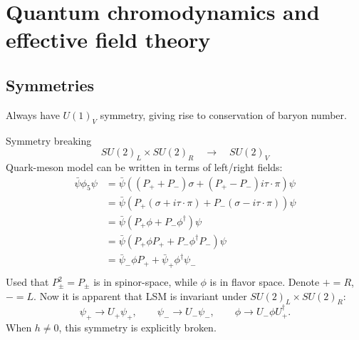 


\section{Quantum chromodynamics and effective field theory}







\subsection{Symmetries}

Always have $U(1)_V$ symmetry, giving rise to conservation of baryon number.

Symmetry breaking
\begin{equation}
	SU(2)_L \times SU(2)_R \quad \rightarrow \quad SU(2)_V
\end{equation}
Quark-meson model can be written in terms of left/right fields:
\begin{equation}
\begin{split}
	\bar{\psi} \phi_5 \psi &= \bar{\psi} ( (P_+ + P_-) \sigma + (P_+ - P_-) i \tau \cdot \pi) \psi \\
	                       &= \bar{\psi} ( P_+ (\sigma + i \tau \cdot \pi) + P_- (\sigma - i \tau \cdot \pi) ) \psi \\
	                       &= \bar{\psi} ( P_+ \phi + P_- \phi^\dagger) \psi \\
	                       &= \bar{\psi} ( P_+ \phi P_+ + P_- \phi^\dagger P_-) \psi \\
	                       &= \bar{\psi}_- \phi P_+ + \bar{\psi}_+ \phi^\dagger \psi_- \\
\end{split}
\end{equation}
Used that $P_\pm^2 = P_\pm$ is in spinor-space, while $\phi$ is in flavor space.
Denote $+ = R$, $- = L$.
Now it is apparent that LSM is invariant under $SU(2)_L \times SU(2)_R$:
\begin{equation}
	\psi_+ \rightarrow U_+ \psi_+, \qquad
	\psi_- \rightarrow U_- \psi_-, \qquad
	\phi   \rightarrow U_- \phi U_+^\dagger.
\end{equation}
When $h \neq 0$, this symmetry is explicitly broken.



